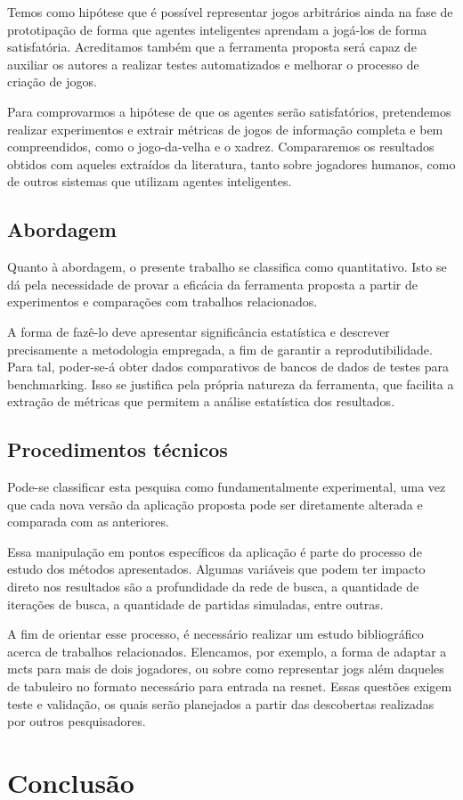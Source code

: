 \documentclass[12pt]{article}
\begin{document}
Temos como hipótese que é possível representar jogos arbitrários ainda na fase de prototipação de forma que agentes inteligentes aprendam a jogá-los de forma satisfatória.
Acreditamos também que a ferramenta proposta será capaz de auxiliar os autores a realizar testes automatizados e melhorar o processo de criação de jogos.

Para comprovarmos a hipótese de que os agentes serão satisfatórios, pretendemos realizar experimentos e extrair métricas de jogos de informação completa e bem compreendidos, como o jogo-da-velha e o xadrez.
Compararemos os resultados obtidos com aqueles extraídos da literatura, tanto sobre jogadores humanos, como de outros sistemas que utilizam agentes inteligentes.

\subsection{Abordagem}

Quanto à abordagem, o presente trabalho se classifica como quantitativo.
Isto se dá pela necessidade de provar a eficácia da ferramenta proposta a partir de experimentos e comparações com trabalhos relacionados.

A forma de fazê-lo deve apresentar significância estatística e descrever precisamente a metodologia empregada, a fim de garantir a reprodutibilidade.
Para tal, poder-se-á obter dados comparativos de bancos de dados de testes para benchmarking.
Isso se justifica pela própria natureza da ferramenta, que facilita a extração de métricas que permitem a análise estatística dos resultados.

\subsection{Procedimentos técnicos}

Pode-se classificar esta pesquisa como fundamentalmente experimental, uma vez que cada nova versão da aplicação proposta pode ser diretamente alterada e comparada com as anteriores.

Essa manipulação em pontos específicos da aplicação é parte do processo de estudo dos métodos apresentados.
Algumas variáveis que podem ter impacto direto nos resultados são a profundidade da rede de busca, a quantidade de iterações de busca, a quantidade de partidas simuladas, entre outras.

A fim de orientar esse processo, é necessário realizar um estudo bibliográfico acerca de trabalhos relacionados.
Elencamos, por exemplo, a forma de adaptar a \gls{mcts} para mais de dois jogadores, ou sobre como representar jogs além daqueles de tabuleiro no formato necessário para entrada na \gls{resnet}.
Essas questões exigem teste e validação, os quais serão planejados a partir das descobertas realizadas por outros pesquisadores.

\section{Conclusão}%
\label{sec:conclusao}


\printbibliography{}
\end{document}
